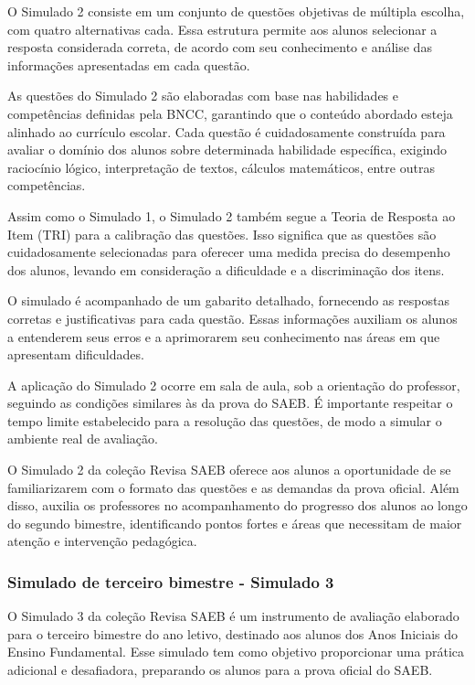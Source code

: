 O Simulado 2 consiste em um conjunto de questões objetivas de múltipla
escolha, com quatro alternativas cada. Essa estrutura permite aos alunos
selecionar a resposta considerada correta, de acordo com seu
conhecimento e análise das informações apresentadas em cada questão.

As questões do Simulado 2 são elaboradas com base nas habilidades e
competências definidas pela BNCC, garantindo que o conteúdo abordado
esteja alinhado ao currículo escolar. Cada questão é cuidadosamente
construída para avaliar o domínio dos alunos sobre determinada
habilidade específica, exigindo raciocínio lógico, interpretação de
textos, cálculos matemáticos, entre outras competências.

Assim como o Simulado 1, o Simulado 2 também segue a Teoria de Resposta
ao Item (TRI) para a calibração das questões. Isso significa que as
questões são cuidadosamente selecionadas para oferecer uma medida
precisa do desempenho dos alunos, levando em consideração a dificuldade
e a discriminação dos itens.

O simulado é acompanhado de um gabarito detalhado, fornecendo as
respostas corretas e justificativas para cada questão. Essas informações
auxiliam os alunos a entenderem seus erros e a aprimorarem seu
conhecimento nas áreas em que apresentam dificuldades.

A aplicação do Simulado 2 ocorre em sala de aula, sob a orientação do
professor, seguindo as condições similares às da prova do SAEB. É
importante respeitar o tempo limite estabelecido para a resolução das
questões, de modo a simular o ambiente real de avaliação.

O Simulado 2 da coleção Revisa SAEB oferece aos alunos a oportunidade de se
familiarizarem com o formato das questões e as demandas da prova
oficial. Além disso, auxilia os professores no acompanhamento do
progresso dos alunos ao longo do segundo bimestre, identificando pontos
fortes e áreas que necessitam de maior atenção e intervenção pedagógica.

\subsubsection{Simulado de terceiro bimestre - Simulado
3}\label{simulado-de-terceiro-bimestre---simulado-3}

O Simulado 3 da coleção Revisa SAEB é um instrumento de avaliação elaborado para o
terceiro bimestre do ano letivo, destinado aos alunos dos Anos Iniciais
do Ensino Fundamental. Esse simulado tem como objetivo proporcionar uma
prática adicional e desafiadora, preparando os alunos para a prova
oficial do SAEB.

